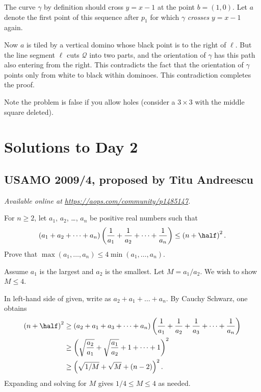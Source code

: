 \documentclass[11pt]{scrartcl}
\begin{document}
The curve $\gamma$ by definition should cross $y=x-1$ at the point $b = (1,0)$.
Let $a$ denote the first point of this sequence
after $p_1$ for which $\gamma$ \emph{crosses} $y=x-1$ again.

Now $a$ is tiled by a vertical domino whose black point is to the right of $\ell$.
But the line segment $\ell$ cuts $\mathcal Q$ into two parts,
and the orientation of $\gamma$ has this path also entering from the right.
This contradicts the fact that the orientation of $\gamma$
points only from white to black within dominoes.
This contradiction completes the proof.

\begin{remark*}
  Note the problem is false if you allow holes
  (consider a $3 \times 3$ with the middle square deleted).
\end{remark*}
\pagebreak

\section{Solutions to Day 2}
\subsection{USAMO 2009/4, proposed by Titu Andreescu}
\textsl{Available online at \url{https://aops.com/community/p1485147}.}
\begin{mdframed}[style=mdpurplebox,frametitle={Problem statement}]
For $n \ge 2$, let $a_1$, $a_2$, \dots, $a_n$ be positive real numbers such that
\[
  \left( a_1 + a_2 + \dots + a_n \right)
  \left( \frac{1}{a_1} + \frac{1}{a_2} + \dots + \frac{1}{a_n} \right)
  \le \left( n + \half \right)^2.
\]
Prove that $\max\left( a_1, \dots, a_n \right) \le 4 \min\left( a_1, \dots, a_n \right)$.
\end{mdframed}
Assume $a_1$ is the largest and $a_2$ is the smallest.
Let $M = a_1/a_2$.
We wish to show $M \le 4$.

In left-hand side of given, write as $a_2+a_1 + \dots + a_n$.
By Cauchy Schwarz, one obtains
\begin{align*}
  \left( n+\half \right)^2 &\ge
    \left( a_2 + a_1 + a_3 + \dots + a_n  \right)
    \left( \frac{1}{a_1} + \frac{1}{a_2} + \frac{1}{a_3}
      + \dots + \frac{1}{a_n} \right) \\
  &\ge \left(\sqrt{\frac{a_2}{a_1}} + \sqrt{\frac{a_1}{a_2}}
    + 1 + \dots + 1 \right)^2 \\
  &\ge \left(\sqrt{1/M} + \sqrt{M} + (n-2) \right)^2.
\end{align*}
Expanding and solving for $M$ gives $1/4 \le M \le 4$ as needed.
\pagebreak
\end{document}
